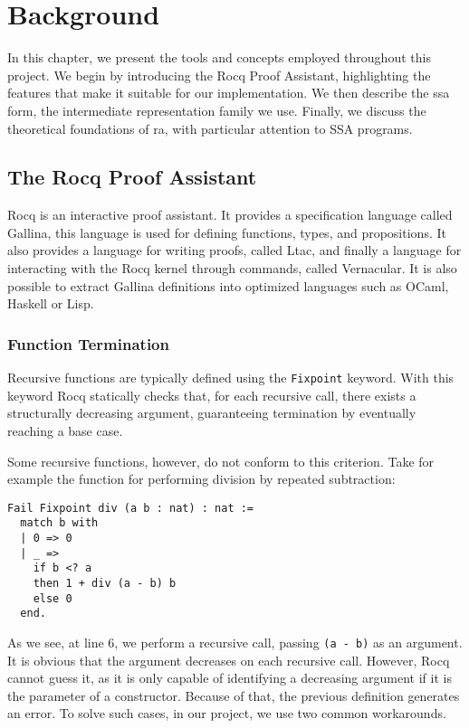 
\chapter{Background}
\label{cha:background}

In this chapter, we present the tools and concepts employed throughout this project. We begin by introducing the Rocq Proof Assistant, highlighting the features that make it suitable for our implementation. We then describe the \gls{ssa} form, the intermediate representation family we use. Finally, we discuss the theoretical foundations of \gls{ra}, with particular attention to SSA programs.

\section{The Rocq Proof Assistant}

Rocq is an interactive proof assistant. It provides a specification language called Gallina, this language is used for defining functions, types, and propositions. It also provides a language for writing proofs, called Ltac, and finally a language for interacting with the Rocq kernel through commands, called Vernacular. It is also possible to extract Gallina definitions into optimized languages such as OCaml, Haskell or Lisp.

\subsection{Function Termination}
\label{subsec:funterm}

Recursive functions are typically defined using the \texttt{Fixpoint} keyword. With this keyword Rocq statically checks that, for each recursive call, there exists a structurally decreasing argument, guaranteeing termination by eventually reaching a base case.

Some recursive functions, however, do not conform to this criterion. Take for example the function for performing division by repeated subtraction:

\begin{lstlisting}[style=Rocq]
Fail Fixpoint div (a b : nat) : nat :=
  match b with
  | 0 => 0
  | _ =>
    if b <? a
    then 1 + div (a - b) b
    else 0
  end.
\end{lstlisting}

As we see, at line 6, we perform a recursive call, passing \texttt{(a - b)} as an argument. It is obvious that the argument decreases on each recursive call. However, Rocq cannot guess it, as it is only capable of identifying a decreasing argument if it is the parameter of a constructor. Because of that, the previous definition generates an error.
To solve such cases, in our project, we use two common workarounds.

